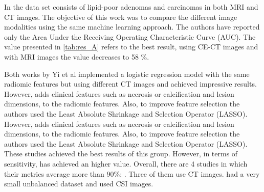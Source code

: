 \documentclass{article}
\begin{document}
In \cite{Ho2019} the data set consists of lipid-poor adenomas and
carcinomas in both MRI and CT images. The objective of this work was to compare
the different image modalities using the same machine learning approach. The
authors have reported only the Area Under the Receiving Operating Characteristic
Curve (AUC). The value presented in \ref{tab:res_A} refers to the best result,
using CE-CT images and with MRI images the value decreases to 58 \%.

Both works by Yi et al \cite{Yi2018, Yi20181} implemented a logistic regression
model with the same radiomic features but using different CT images and achieved
impressive results. However, \cite{Yi2018} adds clinical features such as
necrosis or calcification and lesion dimensions, to the radiomic features. Also,
to improve feature selection the authors used the Least Absolute Shrinkage and
Selection Operator (LASSO).  However, \cite{Yi2018} adds clinical features such
as necrosis or calcification and lesion dimensions, to the radiomic features.
Also, to improve feature selection the authors used the Least Absolute Shrinkage
and Selection Operator (LASSO). These studies achieved the best results of this
group. However, in terms of sensitivity, \cite{Yi2018} has achieved an higher
value. Overall, there are 4 studies in which their metrics average more than
90\%: \cite{Yi2018, Yi20181, Kusunoki2022, Schieda2017}. Three of them use CT
images. \cite{Schieda2017} had a very small unbalanced dataset and used CSI
images. 
\end{document}
